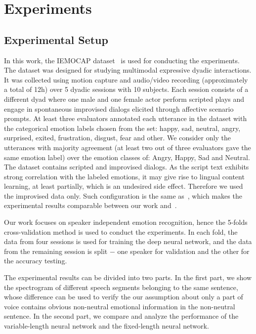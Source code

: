 \documentclass[a4paper]{article}
\begin{document}
\section{Experiments}
\label{sec:experiments}

\subsection{Experimental Setup}
\label{ssec:experimental setup}

In this work, the IEMOCAP dataset~\cite{busso2008} is used for conducting the experiments. The dataset was designed for studying multimodal expressive dyadic interactions. It was collected using motion capture and audio/video recording (approximately a total of 12h) over 5 dyadic sessions with 10 subjects. Each session consists of a different dyad where one male and one female actor perform scripted plays and engage in spontaneous improvised dialogs elicited through affective scenario prompts. At least three evaluators annotated each utterance in the dataset with the categorical emotion labels chosen from the set: happy, sad, neutral, angry, surprised, exited, frustration, disgust, fear and other. We consider only the utterances with majority agreement (at least two out of three evaluators gave the same emotion label) over the emotion classes of: Angry, Happy, Sad and Neutral. The dataset contains scripted and improvised dialogs. As the script text exhibits strong correlation with the labeled emotions, it may give rise to lingual content learning, at least partially, which is an undesired side effect. Therefore we used the improvised data only. Such configuration is the same as~\cite{satt2017}, which makes the experimental results comparable between our work and~\cite{satt2017}.

Our work focuses on speaker independent emotion recognition, hence the 5-folds cross-validation method is used to conduct the experiments. In each fold, the data from four sessions is used for training the deep neural network, and the data from the remaining session is split $-$ one speaker for validation and the other for the accuracy testing.

The experimental results can be divided into two parts. In the first part, we show the spectrogram of different speech segments belonging to the same sentence, whose difference can be used to verify the our assumption about only a part of voice contains obvious non-neutral emotional information in the non-neutral sentence. In the second part, we compare and analyze the performance of the variable-length neural network and the fixed-length neural network.
\end{document}
